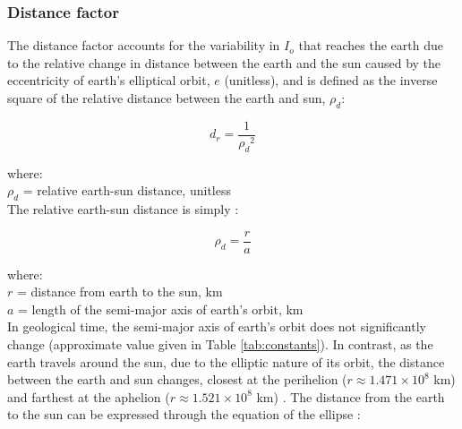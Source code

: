 \subsubsection{Distance factor}
\label{sec:dr}
The distance factor accounts for the variability in $I_o$ that reaches the earth due to the relative change in distance between the earth and the sun caused by the eccentricity of earth’s elliptical orbit, $e$ (unitless), and is defined as the inverse square of the relative distance between the earth and sun, $\rho_{d}$:

\begin{equation}
\label{eq:dr}
    d_{r} = \frac{1}{{\rho_{d}}^2}
\end{equation}

\noindent where: \\
\indent $\rho_{d}$ = relative earth-sun distance, unitless \\

\noindent The relative earth-sun distance is simply \parencite{loutre03}:

\begin{equation}
\label{eq:rho}
    \rho_{d} = \frac{r}{a}
\end{equation}

\noindent where: \\
\indent $r$ = distance from earth to the sun, km \\
\indent $a$ = length of the semi-major axis of earth's orbit, km\\

\noindent In geological time, the semi-major axis of earth's orbit does not significantly change (approximate value given in Table \ref{tab:constants}). 
In contrast, as the earth travels around the sun, due to the elliptic nature of its orbit, the distance between the earth and sun changes, closest at the perihelion ($r \approx 1.471 \times 10^8$ km) and farthest at the aphelion ($r \approx 1.521 \times 10^8$ km) \parencite{allen73}. 
The distance from the earth to the sun can be expressed through the equation of the ellipse \parencite{loutre03}:

